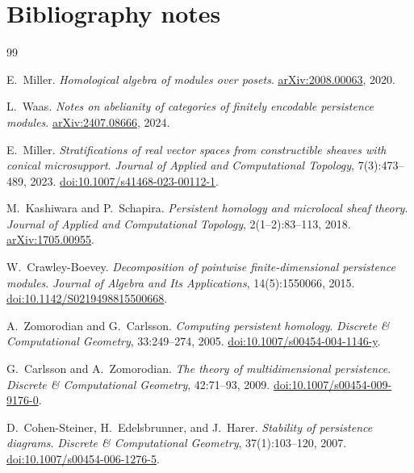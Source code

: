 \documentclass[11pt]{article}
\theoremstyle{definition}
\theoremstyle{remark}
\begin{document}
\section{Bibliography notes}\label{app:bibliography-notes}

\begin{thebibliography}{99}

E.~Miller.
\newblock \emph{Homological algebra of modules over posets}.
\newblock \href{https://arxiv.org/abs/2008.00063}{arXiv:2008.00063}, 2020.

L.~Waas.
\newblock \emph{Notes on abelianity of categories of finitely encodable persistence modules}.
\newblock \href{https://arxiv.org/abs/2407.08666}{arXiv:2407.08666}, 2024.

E.~Miller.
\newblock \emph{Stratifications of real vector spaces from constructible sheaves with conical microsupport}.
\newblock \emph{Journal of Applied and Computational Topology}, 7(3):473--489, 2023.
\newblock \href{https://doi.org/10.1007/s41468-023-00112-1}{doi:10.1007/s41468-023-00112-1}.

M.~Kashiwara and P.~Schapira.
\newblock \emph{Persistent homology and microlocal sheaf theory}.
\newblock \emph{Journal of Applied and Computational Topology}, 2(1--2):83--113, 2018.
\newblock \href{https://arxiv.org/abs/1705.00955}{arXiv:1705.00955}.

W.~Crawley-Boevey.
\newblock \emph{Decomposition of pointwise finite-dimensional persistence modules}.
\newblock \emph{Journal of Algebra and Its Applications}, 14(5):1550066, 2015.
\newblock \href{https://doi.org/10.1142/S0219498815500668}{doi:10.1142/S0219498815500668}.

A.~Zomorodian and G.~Carlsson.
\newblock \emph{Computing persistent homology}.
\newblock \emph{Discrete \& Computational Geometry}, 33:249--274, 2005.
\newblock \href{https://doi.org/10.1007/s00454-004-1146-y}{doi:10.1007/s00454-004-1146-y}.

G.~Carlsson and A.~Zomorodian.
\newblock \emph{The theory of multidimensional persistence}.
\newblock \emph{Discrete \& Computational Geometry}, 42:71--93, 2009.
\newblock \href{https://doi.org/10.1007/s00454-009-9176-0}{doi:10.1007/s00454-009-9176-0}.

D.~Cohen-Steiner, H.~Edelsbrunner, and J.~Harer.
\newblock \emph{Stability of persistence diagrams}.
\newblock \emph{Discrete \& Computational Geometry}, 37(1):103--120, 2007.
\newblock \href{https://doi.org/10.1007/s00454-006-1276-5}{doi:10.1007/s00454-006-1276-5}.


\end{thebibliography}
\end{document}
